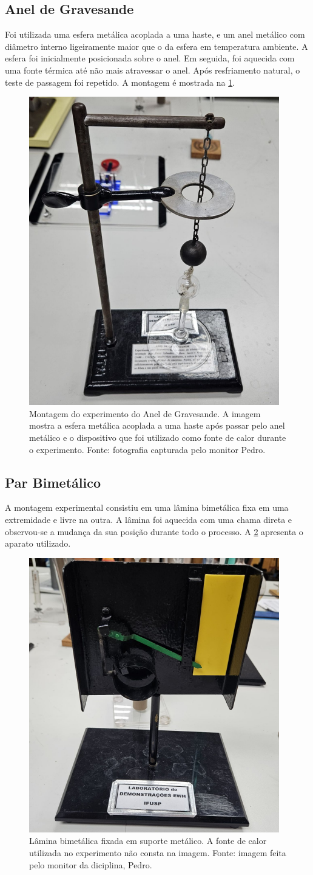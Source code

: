 \subsection{Anel de Gravesande}
Foi utilizada uma esfera metálica acoplada a uma haste, e um anel metálico com diâmetro interno ligeiramente maior que o da esfera em temperatura ambiente. A esfera foi inicialmente posicionada sobre o anel. Em seguida, foi aquecida com uma fonte térmica até não mais atravessar o anel. Após resfriamento natural, o teste de passagem foi repetido. A montagem é mostrada na \cref{fig:gravesande}.

\begin{figure}[H]
    \centering
    \includegraphics[width=0.30\linewidth]{fig/gravesande.png}
    \caption{Montagem do experimento do Anel de Gravesande. A imagem mostra a esfera metálica acoplada a uma haste após passar pelo anel metálico e o dispositivo que foi utilizado como fonte de calor durante o experimento. Fonte: fotografia capturada pelo monitor Pedro.}
    \label{fig:gravesande}
\end{figure}

\subsection{Par Bimetálico}
A montagem experimental consistiu em uma lâmina bimetálica fixa em uma extremidade e livre na outra. A lâmina foi aquecida com uma chama direta e observou-se a mudança da sua posição durante todo o processo. A \cref{fig:bimetalico} apresenta o aparato utilizado.

\begin{figure}[H]
    \centering
    \includegraphics[width=0.35\linewidth]{fig/bimetalico.png}
    \caption{Lâmina bimetálica fixada em suporte metálico. A fonte de calor utilizada no experimento não consta na imagem. Fonte: imagem feita pelo monitor da diciplina, Pedro.}
    \label{fig:bimetalico}
\end{figure}

